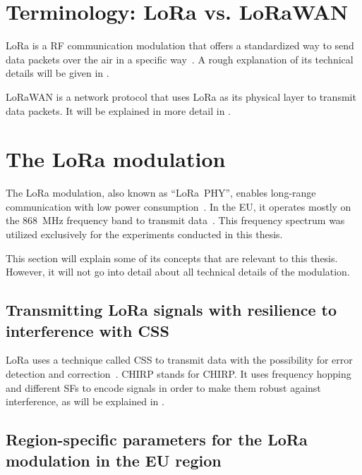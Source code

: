 \section{Terminology: \acs{LoRa} vs. \acs{LoRaWAN}}

\acf{LoRa} is a \ac{RF} communication modulation that offers a standardized way to send data packets over the air in a specific way~\cite{semtech_corporation_lora_2023}.
A rough explanation of its technical details will be given in .

\ac{LoRaWAN} is a network protocol that uses \ac{LoRa} as its physical layer to transmit data packets.
It will be explained in more detail in .

\section{The \acs{LoRa} modulation}\label{sec:lora-modulation}

The \ac{LoRa} modulation, also known as ``\ac{LoRa}\ PHY'', enables long-range communication with low power consumption~\cite{chaudhari_understanding_2022}.
In the \ac{EU}, it operates mostly on the \SI{868}{\mega\hertz} frequency band to transmit data~\cite{lora_alliance_inc_lorawan_regional_2017}.
This frequency spectrum was utilized exclusively for the experiments conducted in this thesis.

This section will explain some of its concepts that are relevant to this thesis.
However, it will not go into detail about all technical details of the modulation.

\subsection{Transmitting \acs{LoRa} signals with resilience to interference with \acl{CSS}}\label{sec:chirp-spread-spectrum}

\ac{LoRa} uses a technique called \acl{CSS} to transmit data with the possibility for error detection and correction~\cite{reynders_chirp_2016}.
\acs{CHIRP} stands for \acl{CHIRP}.
It uses frequency hopping and different \aclp{SF} to encode signals in order to make them robust against interference, as will be explained in .

\subsection{Region-specific parameters for the \acs{LoRa} modulation in the \acs{EU} region}\label{sec:duty-cycle}

